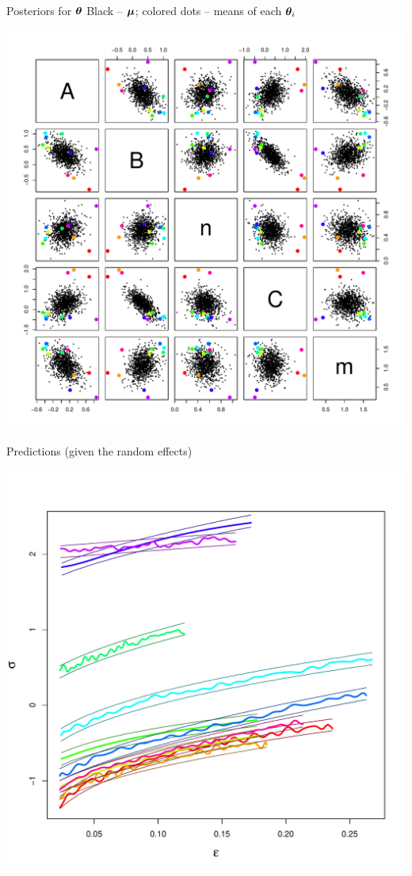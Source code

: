 \documentclass[mathserif, 12pt, t]{beamer}
\begin{document}
\begin{frame}{Posteriors for $\mathbf{\bm{\theta}}$}
Black -- $\mathbf{\bm{\mu}}$; colored dots -- means of each $\mathbf{\bm{\theta}}_i$
\begin{center}
\includegraphics[scale=0.30]{../figs/ms_clusters.pdf}
\end{center}

\end{frame}

\begin{frame}{Predictions (given the random effects)}
\begin{center}
\includegraphics[scale=0.30]{../figs/ms_predsA.pdf}
\end{center}

\end{frame}
\end{document}
